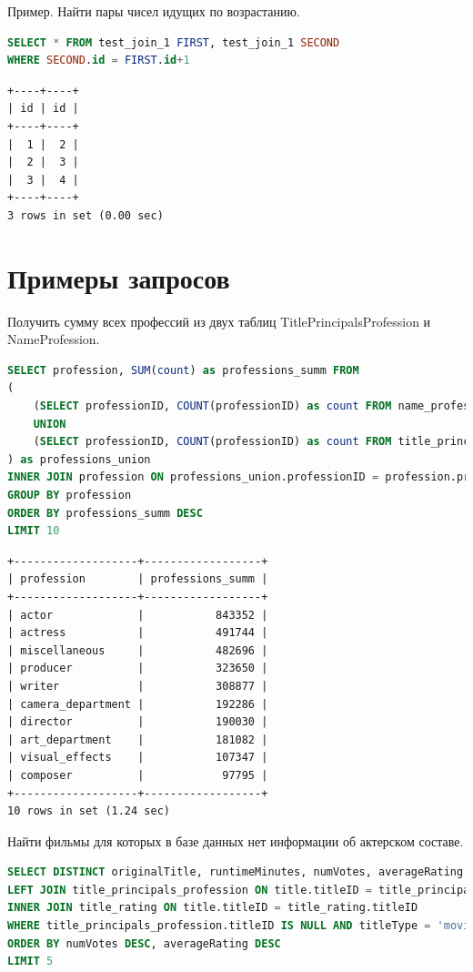 \documentclass[12pt,a4paper]{article}
\begin{document}
Пример. Найти пары чисел идущих по возрастанию.

\begin{lstlisting}[language=SQL]
SELECT * FROM test_join_1 FIRST, test_join_1 SECOND
WHERE SECOND.id = FIRST.id+1
\end{lstlisting}
\begin{lstlisting}[basicstyle = \tiny\ttfamily, columns = fixed]
+----+----+
| id | id |
+----+----+
|  1 |  2 |
|  2 |  3 |
|  3 |  4 |
+----+----+
3 rows in set (0.00 sec)
\end{lstlisting}

\section{Примеры запросов}

Получить сумму всех профессий из двух таблиц TitlePrincipalsProfession и NameProfession.

\begin{lstlisting}[language=SQL]
SELECT profession, SUM(count) as professions_summ FROM 
(	
    (SELECT professionID, COUNT(professionID) as count FROM name_profession GROUP BY professionID)
    UNION
    (SELECT professionID, COUNT(professionID) as count FROM title_principals_profession GROUP BY professionID)
) as professions_union
INNER JOIN profession ON professions_union.professionID = profession.professionID
GROUP BY profession
ORDER BY professions_summ DESC
LIMIT 10
\end{lstlisting}

\begin{lstlisting}[basicstyle = \tiny\ttfamily, columns = fixed]
+-------------------+------------------+
| profession        | professions_summ |
+-------------------+------------------+
| actor             |           843352 |
| actress           |           491744 |
| miscellaneous     |           482696 |
| producer          |           323650 |
| writer            |           308877 |
| camera_department |           192286 |
| director          |           190030 |
| art_department    |           181082 |
| visual_effects    |           107347 |
| composer          |            97795 |
+-------------------+------------------+
10 rows in set (1.24 sec)
\end{lstlisting}

Найти фильмы для которых в базе данных нет информации об актерском составе.

\begin{lstlisting}[language=SQL]
SELECT DISTINCT originalTitle, runtimeMinutes, numVotes, averageRating FROM title 
LEFT JOIN title_principals_profession ON title.titleID = title_principals_profession.titleID
INNER JOIN title_rating ON title.titleID = title_rating.titleID
WHERE title_principals_profession.titleID IS NULL AND titleType = 'movie'
ORDER BY numVotes DESC, averageRating DESC
LIMIT 5
\end{lstlisting}
\end{document}
